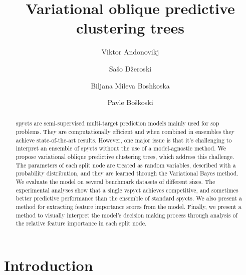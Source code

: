 \documentclass[3p,review,authoryear]{elsarticle}
\begin{document}
\begin{frontmatter}
	\title{Variational oblique predictive clustering trees}
	\author[1,2]{Viktor Andonovikj}
	\author[1]{Sašo Džeroski}
	\author[1,3]{Biljana Mileva Boshkoska}
	\author[1,3]{Pavle Boškoski}
	\address[1]{Jožef Stefan Institute, Jamova cesta 39, 1000 Ljubljana, Slovenia}
	\address[2]{Jožef Stefan International Postgraduate School, Jamova cesta 39, 1000 Ljubljana, Slovenia}
	\address[3]{Faculty of Information Studies in Novo mesto, Ljubljanska cesta 31b, 8000 Novo mesto, Slovenia}
\begin{abstract}

\Glspl{spyct} are semi-supervised multi-target prediction models mainly used for \gls{sop} problems.
They are computationally efficient and when combined in ensembles they achieve state-of-the-art results.
However, one major issue is that it's challenging to interpret an ensemble of \glspl{spyct} without the use of a model-agnostic method.
We propose variational oblique predictive clustering trees, which address this challenge.
The parameters of each split node are treated as random variables, described with a probability distribution, and they are learned through the Variational Bayes method.
We evaluate the model on several benchmark datasets of different sizes.
The experimental analyses show that a single \gls{vspyct} achieves competitive, and sometimes better predictive performance than the ensemble of standard \glspl{spyct}.
We also present a method for extracting feature importance scores from the model.
Finally, we present a method to visually interpret the model's decision making process through analysis of the relative feature importance in each split node.
\end{abstract}
\end{frontmatter}
\glsresetall

\section{Introduction}
\end{document}
